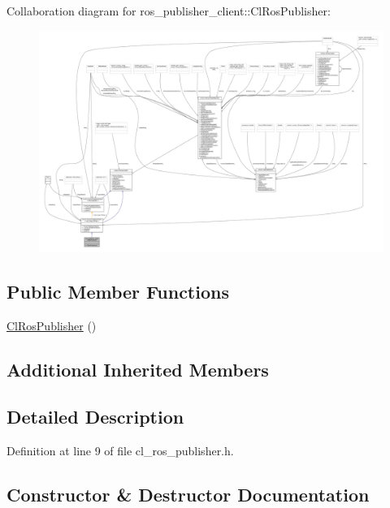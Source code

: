 Collaboration diagram for ros\+\_\+publisher\+\_\+client\+:\+:Cl\+Ros\+Publisher\+:
\nopagebreak
\begin{figure}[H]
\begin{center}
\leavevmode
\includegraphics[width=350pt]{classros__publisher__client_1_1ClRosPublisher__coll__graph}
\end{center}
\end{figure}
\subsection*{Public Member Functions}
\begin{DoxyCompactItemize}
\item 
\hyperlink{classros__publisher__client_1_1ClRosPublisher_a9a5c4a6c97a6fcab30827521891f222f}{Cl\+Ros\+Publisher} ()
\end{DoxyCompactItemize}
\subsection*{Additional Inherited Members}


\subsection{Detailed Description}


Definition at line 9 of file cl\+\_\+ros\+\_\+publisher.\+h.



\subsection{Constructor \& Destructor Documentation}
